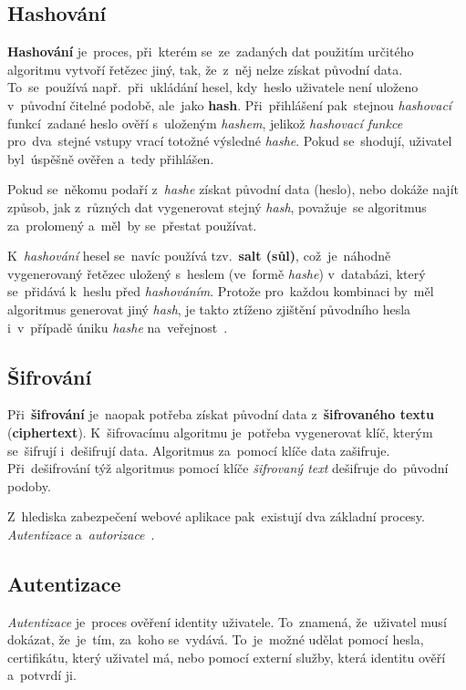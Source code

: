 \documentclass[11pt,a4paper]{report}
\begin{document}
            \subsection{Hashování}
                \textbf{Hashování} je~proces, při~kterém se~ze~zadaných dat použitím určitého algoritmu vytvoří řetězec jiný, tak, že~z~něj nelze získat původní data. To~se~používá např.~při~ukládání hesel, kdy~heslo uživatele není uloženo v~původní čitelné podobě, ale~jako \textbf{hash}. Při~přihlášení pak~stejnou \emph{hashovací} funkcí~zadané heslo ověří s~uloženým \emph{hashem}, jelikož \emph{hashovací funkce} pro~dva~stejné vstupy vrací totožné výsledné \emph{hashe}. Pokud se~shodují, uživatel byl~úspěšně ověřen a~tedy přihlášen.
                
                Pokud se~někomu podaří z~\emph{hashe} získat původní data (heslo), nebo dokáže najít způsob, jak z~různých dat vygenerovat stejný \emph{hash}, považuje~se algoritmus za~prolomený a~měl~by se~přestat používat.
                
                K~\emph{hashování} hesel se~navíc používá tzv.~\textbf{salt (sůl)}, což~je~náhodně vygenerovaný řetězec uložený s~heslem (ve~formě \emph{hashe}) v~databázi, který se~přidává k~heslu před \emph{hashováním}. Protože pro~každou kombinaci by~měl algoritmus generovat jiný \emph{hash}, je takto ztíženo zjištění původního hesla i~v~případě úniku \emph{hashe} na~veřejnost~\cite{graham2021ethical}.
        
            \subsection{Šifrování}
                Při~\textbf{šifrování} je~naopak potřeba získat původní data z~\textbf{šifrovaného textu} (\textbf{ciphertext}). K~šifrovacímu algoritmu je~potřeba vygenerovat klíč, kterým se~šifrují i~dešifrují data. Algoritmus za~pomocí klíče data zašifruje. Při~dešifrování týž algoritmus pomocí klíče \emph{šifrovaný text} dešifruje do~původní podoby.

                Z~hlediska zabezpečení webové aplikace pak~existují dva základní procesy. \emph{Autentizace} a~\emph{autorizace}~\cite{graham2021ethical}.

            \subsection{Autentizace}
                \emph{Autentizace} je~proces ověření identity uživatele. To~znamená, že~uživatel musí dokázat, že~je~tím, za~koho se~vydává. To~je~možné udělat pomocí hesla, certifikátu, který uživatel má, nebo pomocí externí služby, která identitu ověří a~potvrdí ji.
                
\end{document}
